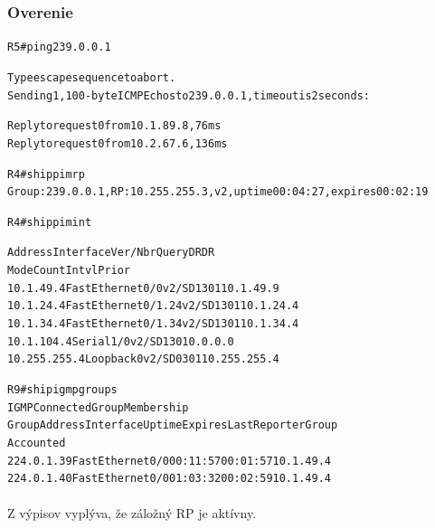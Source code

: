 \documentclass[12pt,twoside,a4paper]{report}
\begin{document}
\subsubsection{Overenie}

\noindent
{\selectfont
\begin{small}
\begin{alltt}
R5#ping 239.0.0.1

Type escape sequence to abort.
Sending 1, 100-byte ICMP Echos to 239.0.0.1, timeout is 2 seconds:

Reply to request 0 from 10.1.89.8, 76 ms
Reply to request 0 from 10.2.67.6, 136 ms

R4#sh ip pim rp
Group: 239.0.0.1, RP: 10.255.255.3, v2, uptime 00:04:27, expires 00:02:19

R4#sh ip pim int

Address          Interface            Ver/   Nbr    Query  DR     DR
                                      Mode   Count  Intvl  Prior
10.1.49.4        FastEthernet0/0      v2/SD  1      30     1      10.1.49.9
10.1.24.4        FastEthernet0/1.24   v2/SD  1      30     1      10.1.24.4
10.1.34.4        FastEthernet0/1.34   v2/SD  1      30     1      10.1.34.4
10.1.104.4       Serial1/0            v2/SD  1      30     1      0.0.0.0
10.255.255.4     Loopback0            v2/SD  0      30     1      10.255.255.4

R9#sh ip igmp groups
IGMP Connected Group Membership
Group Address  Interface        Uptime    Expires   Last Reporter   Group
                                                                    Accounted
224.0.1.39     FastEthernet0/0  00:11:57  00:01:57  10.1.49.4
224.0.1.40     FastEthernet0/0  01:03:32  00:02:59  10.1.49.4

\end{alltt}
\end{small}
}

\paragraph{}
Z výpisov vyplýva, že záložný RP je aktívny.
\end{document}
